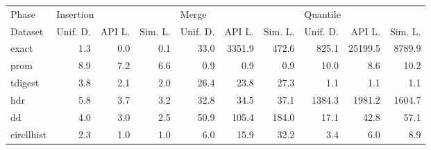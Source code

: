 \begin{tabular}{lrrrrrrrrr}
\toprule
Phase & \multicolumn{3}{l}{Insertion} & \multicolumn{3}{l}{Merge} & \multicolumn{3}{l}{Quantile} \\
Dataset &  Unif. D. & API L. & Sim. L. & Unif. D. & API L. & Sim. L. & Unif. D. &  API L. & Sim. L. \\
\midrule
exact      &       1.3 &    0.0 &     0.1 &     33.0 & 3351.9 &   472.6 &    825.1 & 25199.5 &  8789.9 \\
prom       &       8.9 &    7.2 &     6.6 &      0.9 &    0.9 &     0.9 &     10.0 &     8.6 &    10.2 \\
tdigest    &       3.8 &    2.1 &     2.0 &     26.4 &   23.8 &    27.3 &      1.1 &     1.1 &     1.1 \\
hdr        &       5.8 &    3.7 &     3.2 &     32.8 &   34.5 &    37.1 &   1384.3 &  1981.2 &  1604.7 \\
dd         &       4.0 &    3.0 &     2.5 &     50.9 &  105.4 &   184.0 &     17.1 &    42.8 &    57.1 \\
circllhist &       2.3 &    1.0 &     1.0 &      6.0 &   15.9 &    32.2 &      3.4 &     6.0 &     8.9 \\
\bottomrule
\end{tabular}
